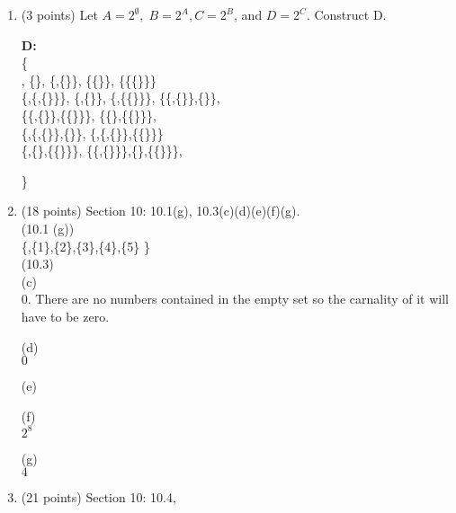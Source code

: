 \documentclass[12pt]{article}
\begin{document}
\begin{enumerate}
    
    
    
    \item (3 points) Let $A = 2^{\emptyset}, \; B = 2^{A}, C = 2^{B}$, and $D = 2^{C}$.  Construct D.   
    
        

    \textbf{D:}\\
    \noindent{} \{\\
    \emptyset,
    {\{\emptyset\}},   \{\emptyset,\{\emptyset\}\},    \{\{\emptyset\}\},    \{\{\{\emptyset\}\}\} \\
    \{\emptyset,\{\emptyset,\{\emptyset\}\}\},  \{\emptyset,\{\emptyset\}\},  \{\emptyset,\{\{\emptyset\}\}\},  \{\{\emptyset,\{\emptyset\}\},\{\emptyset\}\},\\
    \{\{\emptyset,\{\emptyset\}\},\{\{\emptyset\}\}\}, \{\{\emptyset\},\{\{\emptyset\}\}\},\\
    \{\emptyset,\{\emptyset,\{\emptyset\}\},\{\emptyset\}\}, \{\emptyset,\{\emptyset,\{\emptyset\}\},\{\{\emptyset\}\}\}\\
    \{\emptyset,\{\emptyset\},\{\{\emptyset\}\}\}, \{\{\emptyset,\{\emptyset\}\}\},\{\emptyset\},\{\{\emptyset\}\}\},
  
    \}

    
    
    
    
    \item (18 points) Section 10:  10.1(g), 10.3(c)(d)(e)(f)(g).  \\
    \noindent(10.1 (g)) \\
    \{\emptyset,\{1\},\{2\},\{3\},\{4\},\{5\} \}\\
    
    \noindent(10.3) \\(c)  \\
    0. There are no numbers contained in the empty set so the carnality of it will have to be zero.
    
    \noindent(d)\\
    $0$
    
    \noindent(e)\\
    \infty
     
    \noindent(f)\\
    $2^8$
     
    \noindent(g)\\
    $4$
    
    
    
    \item (21 points) Section 10: 10.4, 
    

\end{enumerate}
\end{document}
